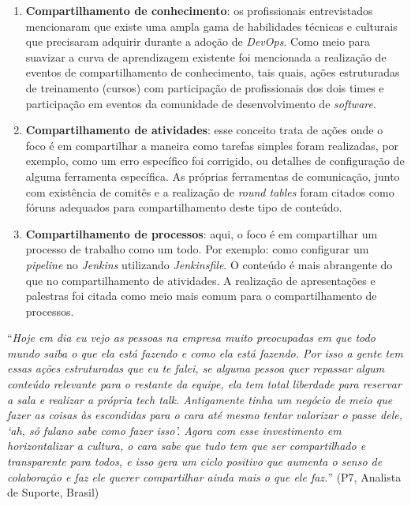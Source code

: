 \begin{enumerate}
\item {\bf Compartilhamento de conhecimento}: os profissionais entrevistados
mencionaram que existe uma ampla gama de habilidades técnicas e culturais que
precisaram adquirir durante a adoção de {\it DevOps}. Como meio para suavizar a
curva de aprendizagem existente foi mencionada a realização de eventos de
compartilhamento de conhecimento, tais quais, ações estruturadas de treinamento
(cursos) com participação de profissionais dos dois times e participação em
eventos da comunidade de desenvolvimento de {\it software}.

\item {\bf Compartilhamento de atividades}: esse conceito trata de ações onde o
foco é em compartilhar a maneira como tarefas simples foram realizadas, por
exemplo, como um erro específico foi corrigido, ou detalhes de configuração de
alguma ferramenta específica. As próprias ferramentas de comunicação, junto com
existência de comitês e a realização de {\it round tables} foram citados como
fóruns adequados para compartilhamento deste tipo de conteúdo.

\item {\bf Compartilhamento de processos}: aqui, o foco é em compartilhar um
processo de trabalho como um todo. Por exemplo: como configurar um {\it pipeline}
no {\it Jenkins} utilizando {\it Jenkinsfile}. O conteúdo é mais abrangente do
que no compartilhamento de atividades. A realização de apresentações e palestras
foi citada como meio mais comum para o compartilhamento de processos.
\end{enumerate}

\begin{mq}
``\emph{Hoje em dia eu vejo as pessoas na empresa muito preocupadas em que todo
mundo saiba o que ela está fazendo e como ela está fazendo. Por isso a gente
tem essas ações estruturadas que eu te falei, se alguma pessoa quer repassar
algum conteúdo relevante para o restante da equipe, ela tem total liberdade para
reservar a sala e realizar a própria tech talk. Antigamente tinha um negócio de
meio que fazer as coisas às escondidas para o cara até mesmo tentar valorizar
o passe dele, `ah, só fulano sabe como fazer isso'. Agora com esse investimento
em horizontalizar a cultura, o cara sabe que tudo tem que ser compartilhado e
transparente para todos, e isso gera um ciclo positivo que aumenta o senso
de colaboração e faz ele querer compartilhar ainda mais o que ele faz.}''
(P7, Analista de Suporte, Brasil)
\end{mq}

